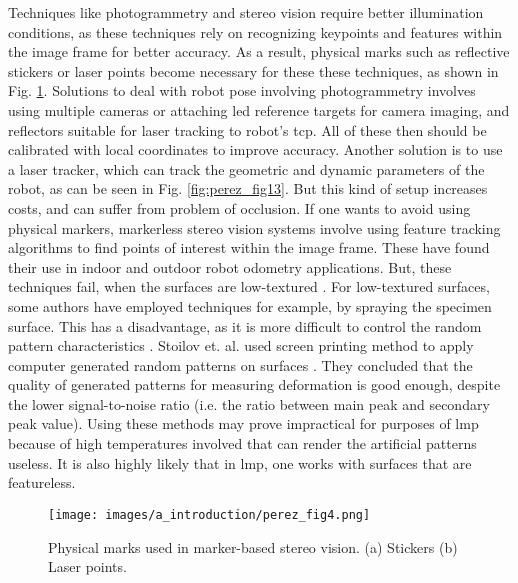     \vspace{5mm}
    
    
    \noindent Techniques like photogrammetry and stereo vision require better illumination conditions, as these techniques rely on recognizing keypoints and features within the image frame for better accuracy. As a result, physical marks such as reflective stickers or laser points become necessary for these these techniques, as shown in Fig. \ref{fig:fig_perez_4}. Solutions to deal with robot pose involving photogrammetry involves using multiple cameras or attaching \gls{led} reference targets for camera imaging, and reflectors suitable for laser tracking to robot's \gls{tcp}. All of these then should be calibrated with local coordinates to improve accuracy. Another solution is to use a laser tracker, which can track the geometric and dynamic parameters of the robot, as can be seen in Fig. \ref{fig:perez_fig13}. But this kind of setup increases costs, and can suffer from problem of occlusion. If one wants to avoid using physical markers, markerless stereo vision systems involve using feature tracking algorithms to find points of interest within the image frame. These have found their use in indoor and outdoor robot odometry applications. But, these techniques fail, when the surfaces are low-textured \cite{perez}. For low-textured surfaces, some authors have employed techniques for example, by spraying the specimen surface. This has a disadvantage, as it is more difficult to control the random pattern characteristics \cite{stoilov}. Stoilov et. al. used screen printing method to apply computer generated random patterns on surfaces \cite{stoilov}. They concluded that the quality of generated patterns for measuring deformation is good enough, despite the lower signal-to-noise ratio (i.e. the ratio between main peak and secondary peak value). Using these methods may prove impractical for purposes of \gls{lmp} because of high temperatures involved that can render the artificial patterns useless. It is also highly likely that in \Gls{lmp}, one works with surfaces that are featureless.

    \vspace{5mm}
    \begin{figure}[h]
        \centering
        \texttt{[image: images/a\_introduction/perez\_fig4.png]}
        \caption{Physical marks used in marker-based stereo vision. (a) Stickers (b) Laser points. \cite{perez}}
        \label{fig:fig_perez_4}
    \end{figure}
    \vspace{5mm}

